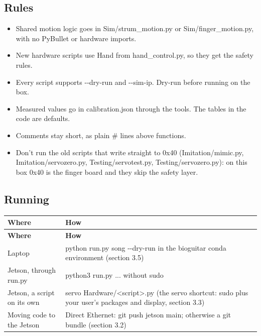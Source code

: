 \documentclass[11pt,letterpaper]{article}
\newcommand{\code}[1]{\textcolor{codeblue}{\ttfamily\smaller\relax #1}}
\begin{document}
\subsection{Rules}
\begin{itemize}
  \item Shared motion logic goes in \code{Sim/\allowbreak{}strum\_\allowbreak{}motion.py} or \code{Sim/\allowbreak{}finger\_\allowbreak{}motion.py}, with no PyBullet or hardware imports.
  \item New hardware scripts use \code{Hand} from \code{hand\_\allowbreak{}control.py}, so they get the safety rules.
  \item Every script supports \code{-{}-{}dry-{}\allowbreak{}run} and \code{-{}-{}sim-{}\allowbreak{}ip}. Dry-run before running on the box.
  \item Measured values go in \code{calibration.json} through the tools. The tables in the code are defaults.
  \item Comments stay short, as plain \code{\#} lines above functions.
  \item Don't run the old scripts that write straight to 0x40 (\code{Imitation/\allowbreak{}mimic.py}, \code{Imitation/\allowbreak{}servozero.py}, \code{Testing/\allowbreak{}servotest.py}, \code{Testing/\allowbreak{}servozero.py}): on this box 0x40 is the finger board and they skip the safety layer.
\end{itemize}


\subsection{Running}
{\small
\begin{longtable}{|>{\raggedright\arraybackslash}p{}|>{\raggedright\arraybackslash}p{}|}
\hline
\rowcolor{tblhead}\textbf{Where} & \textbf{How} \\ \hline
\endfirsthead
\hline
\rowcolor{tblhead}\textbf{Where} & \textbf{How} \\ \hline
\endhead
Laptop & \code{python run.py song -{}-{}dry-{}\allowbreak{}run} in the \code{bioguitar} conda environment (section 3.5) \\ \hline
Jetson, through \code{run.py} & \code{python3 run.py ...} without sudo \\ \hline
Jetson, a script on its own & \code{servo Hardware/\allowbreak{}<script>.py} (the \code{servo} shortcut: sudo plus your user's packages and display, section 3.3) \\ \hline
Moving code to the Jetson & Direct Ethernet: \code{git push jetson main}; otherwise a git bundle (section 3.2) \\ \hline
\end{longtable}}
\end{document}
